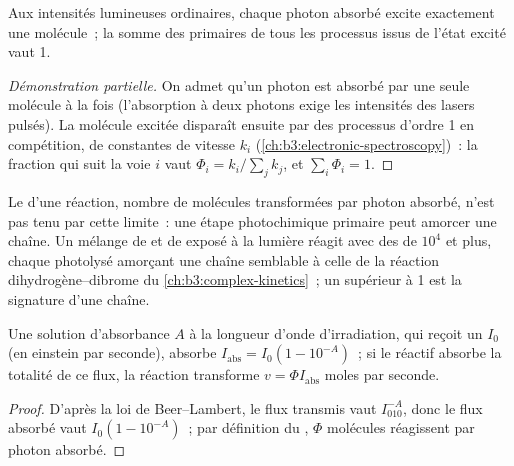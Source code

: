 \begin{proposition}\label{prop:b3:photochemistry:stark-einstein}
Aux intensités lumineuses ordinaires, chaque photon absorbé excite
exactement une molécule~; la somme des  primaires
de tous les processus issus de l'état excité vaut 1.
\end{proposition}

\begin{proof}[Démonstration partielle]
On admet qu'un photon est absorbé par une seule molécule à la fois
(l'absorption à deux photons exige les intensités des lasers pulsés). La
molécule excitée disparaît ensuite par des processus d'ordre 1 en
compétition, de constantes de vitesse $k_i$
(\cref{ch:b3:electronic-spectroscopy})~: la fraction qui suit la voie
$i$ vaut $\Phi_i =
k_i/\sum_jk_j$, et $\sum_i\Phi_i = 1$.
\end{proof}

Le  d'une réaction, nombre de molécules transformées
par photon absorbé, n'est pas tenu par cette limite~: une étape
photochimique primaire peut amorcer une chaîne. Un mélange de  et
de  exposé à la lumière réagit avec des  de
$10^4$ et plus, chaque  photolysé amorçant une chaîne semblable à
celle de la réaction dihydrogène--dibrome du
\cref{ch:b3:complex-kinetics}~; un  supérieur à 1 est
la signature d'une chaîne.

\begin{proposition}\label{prop:b3:photochemistry:rate}
Une solution d'absorbance $A$ à la longueur d'onde d'irradiation, qui
reçoit un  $I_0$ (en einstein par seconde), absorbe
$I_{\mathrm{abs}} = I_0(1 - 10^{-A})$~; si le réactif absorbe la totalité
de ce flux, la réaction transforme $v = \Phi I_{\mathrm{abs}}$ moles par seconde.
\end{proposition}

\begin{proof}
D'après la loi de Beer--Lambert, le flux transmis vaut $I_010^{-A}$, donc
le flux absorbé vaut $I_0(1 - 10^{-A})$~; par définition du , $\Phi$ molécules réagissent par photon absorbé.
\end{proof}

